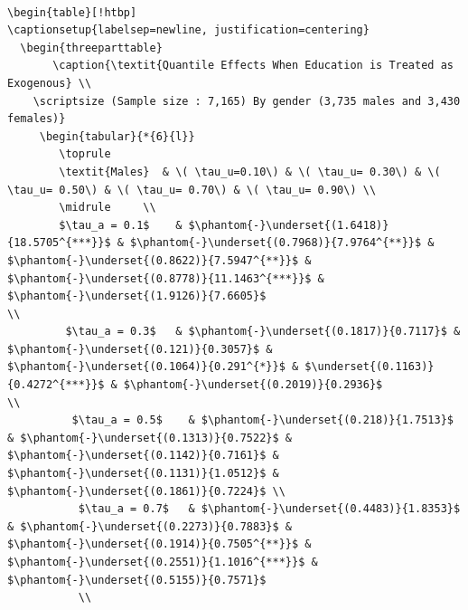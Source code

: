 \documentclass[12pt,a4paper]{article}
\begin{document}
\begin{verbatim}

\begin{table}[!htbp]
\captionsetup{labelsep=newline, justification=centering}
  \begin{threeparttable}
       \caption{\textit{Quantile Effects When Education is Treated as Exogenous} \\
    \scriptsize (Sample size : 7,165) By gender (3,735 males and 3,430 females)}
     \begin{tabular}{*{6}{l}}
        \toprule 
        \textit{Males}  & \( \tau_u=0.10\) & \( \tau_u= 0.30\) & \( \tau_u= 0.50\) & \( \tau_u= 0.70\) & \( \tau_u= 0.90\) \\
        \midrule     \\
        $\tau_a = 0.1$    & $\phantom{-}\underset{(1.6418)}{18.5705^{***}}$ & $\phantom{-}\underset{(0.7968)}{7.9764^{**}}$ & $\phantom{-}\underset{(0.8622)}{7.5947^{**}}$ & $\phantom{-}\underset{(0.8778)}{11.1463^{***}}$ & $\phantom{-}\underset{(1.9126)}{7.6605}$  
\\
         $\tau_a = 0.3$   & $\phantom{-}\underset{(0.1817)}{0.7117}$ & $\phantom{-}\underset{(0.121)}{0.3057}$ & $\phantom{-}\underset{(0.1064)}{0.291^{*}}$ & $\underset{(0.1163)}{0.4272^{***}}$ & $\phantom{-}\underset{(0.2019)}{0.2936}$
\\
          $\tau_a = 0.5$    & $\phantom{-}\underset{(0.218)}{1.7513}$ & $\phantom{-}\underset{(0.1313)}{0.7522}$ & $\phantom{-}\underset{(0.1142)}{0.7161}$ & $\phantom{-}\underset{(0.1131)}{1.0512}$ & $\phantom{-}\underset{(0.1861)}{0.7224}$ \\
           $\tau_a = 0.7$   & $\phantom{-}\underset{(0.4483)}{1.8353}$ & $\phantom{-}\underset{(0.2273)}{0.7883}$ & $\phantom{-}\underset{(0.1914)}{0.7505^{**}}$ & $\phantom{-}\underset{(0.2551)}{1.1016^{***}}$ & $\phantom{-}\underset{(0.5155)}{0.7571}$  
           \\
           

\end{verbatim}
\end{document}
